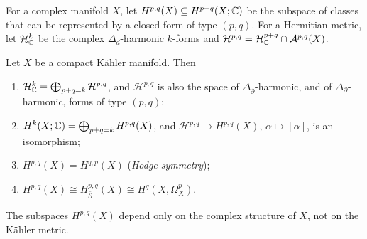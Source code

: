 \begin{definition}\label{hodge-decomposition:definition-hpq}
For a complex manifold $X$, let $H^{p,q}(X) \subseteq H^{p+q}(X; \mathbb{C})$ be the subspace of classes that can be represented by a closed form
of type $(p,q)$. For a Hermitian metric, let $\mathcal{H}^k_{\mathbb{C}}$ be the complex $\Delta_d$-harmonic $k$-forms and
$\mathcal{H}^{p,q} = \mathcal{H}^{p+q}_{\mathbb{C}} \cap \mathcal{A}^{p,q}(X)$.
\end{definition}

\begin{theorem}\label{hodge-decomposition:theorem-hodge-decomposition}
Let $X$ be a compact K\"ahler manifold. Then
\begin{enumerate}
\item $\mathcal{H}^k_{\mathbb{C}} = \bigoplus_{p+q=k}\mathcal{H}^{p,q}$, and $\mathcal{H}^{p,q}$ is also the space of $\Delta_{\bar\partial}$-harmonic,
and of $\Delta_\partial$-harmonic, forms of type $(p,q)$;
\item $H^k(X; \mathbb{C}) = \bigoplus_{p+q=k}H^{p,q}(X)$, and $\mathcal{H}^{p,q} \to H^{p,q}(X)$, $\alpha \mapsto [\alpha]$, is an isomorphism;
\item $\overline{H^{p,q}(X)} = H^{q,p}(X)$ (\emph{Hodge symmetry});
\item $H^{p,q}(X) \cong H^{p,q}_{\bar\partial}(X) \cong H^q(X, \Omega^p_X)$.
\end{enumerate}
The subspaces $H^{p,q}(X)$ depend only on the complex structure of $X$, not on the K\"ahler metric.
\end{theorem}

